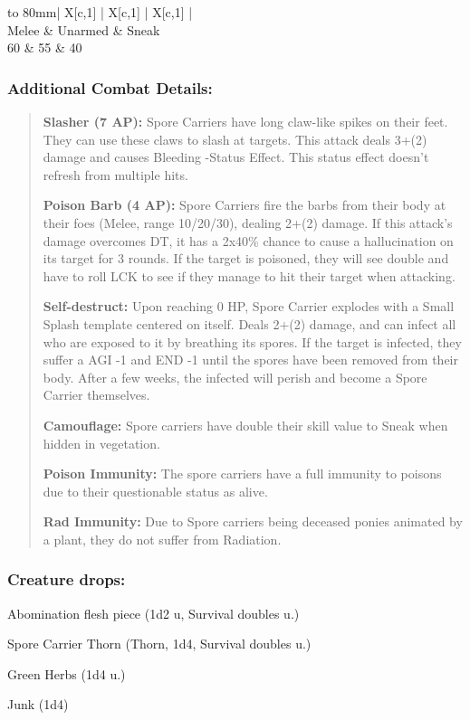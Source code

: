 \documentclass[11pt,a4paper,twocolumn]{book}
\begin{document}
	\bigskip
	{
		\begin{tabu} to 80mm{| X[c,1] | X[c,1] | X[c,1] |}
			\hline
			 \\ \hline
			Melee & Unarmed & Sneak                          \\
			60    & 55      & 40                             \\ \hline
		\end{tabu}
		
	}
	
	\subsubsection*{Additional Combat Details:}
	\begin{verse}
		\textbf{Slasher (7 AP):} Spore Carriers have long claw-like spikes on their feet. They can use these claws to slash at targets. This attack deals 3+(2) damage and causes Bleeding -Status Effect. This status effect doesn't refresh from multiple hits. 
		
		\textbf{Poison Barb (4 AP):} Spore Carriers fire the barbs from their body at their foes (Melee, range 10/20/30), dealing 2+(2) damage. If this attack's damage overcomes DT, it has a 2x40\% chance to cause a hallucination on its target for 3 rounds. If the target is poisoned, they will see double and have to roll LCK to see if they manage to hit their target when attacking.
		
		\textbf{Self-destruct:} Upon reaching 0 HP, Spore Carrier explodes with a Small Splash template centered on itself. Deals 2+(2) damage, and can infect all who are exposed to it by breathing its spores. If the target is infected, they suffer a AGI -1 and END -1 until the spores have been removed from their body. After a few weeks, the infected will perish and become a Spore Carrier themselves.
		
		\textbf{Camouflage:} Spore carriers have double their skill value to Sneak when hidden in vegetation. 
		
		\textbf{Poison Immunity:} The spore carriers have a full immunity to poisons due to their questionable status as alive.
		
		\textbf{Rad Immunity:} Due to Spore carriers being deceased ponies animated by a plant, they do not suffer from Radiation.
	\end{verse}
	
	\subsubsection*{Creature drops:}
	\begin{compactitem}
		\item Abomination flesh piece (1d2 u, Survival doubles u.)
		\item Spore Carrier Thorn (Thorn, 1d4, Survival doubles u.)
		\item Green Herbs (1d4 u.)
		\item Junk (1d4)
	\end{compactitem}
	
\end{document}
